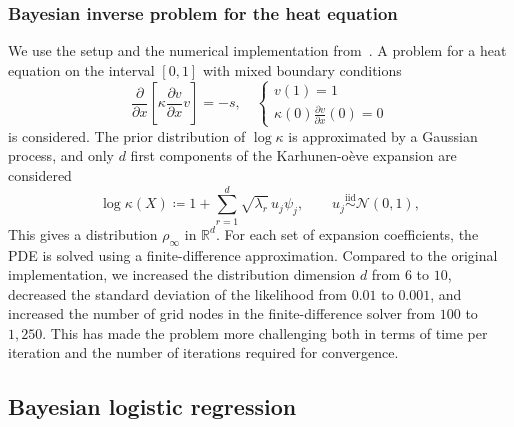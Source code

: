 \documentclass{article} %
\numberwithin{equation}{subsection}
\numberwithin{theorem}{section}
\begin{document}
\subsubsection{Bayesian inverse problem for the heat equation}\label{app:heat_inverse}
        We use the setup and the numerical implementation from~\cite{roberts2026propagating}.
        A problem for a heat equation on the interval $[0, 1]$ with mixed boundary conditions
        \begin{equation*}
            \frac{\partial}{\partial x}\left[ \kappa\frac{\partial v}{\partial x}v\right] = -s,
            \quad 
            \begin{cases}
                v(1) = 1 \\
                \kappa(0) \frac{\partial v}{\partial x}(0) = 0
            \end{cases}
        \end{equation*}
        is considered.
        The prior distribution of $\log \kappa$ is approximated by a Gaussian process, and only $d$ first components of the Karhunen-o\`eve expansion are considered
        \begin{equation*}
            \log \kappa(X) \coloneqq  1 + \sum_{r=1}^{d} \sqrt{\lambda_r}\, u_j \psi_j,
            \qquad u_j \overset{\text{iid}}{\sim} \mathcal{N}(0,1),
        \end{equation*}       
        This gives a distribution $\rho_\infty$ in $\mathbb{R}^d$. 
        For each set of expansion coefficients, the PDE is solved using a finite-difference approximation. 
        Compared to the original implementation, we increased the distribution dimension $d$ from $6$ to $10$, decreased the standard deviation of the likelihood from $0.01$ to $0.001$, and increased the number of grid nodes in the finite-difference solver from $100$ to $1,250$. 
        This has made the problem more challenging both in terms of time per iteration and the number of iterations required for convergence.
    


    \subsection{Bayesian logistic regression}\label{ap:blr}
\end{document}
